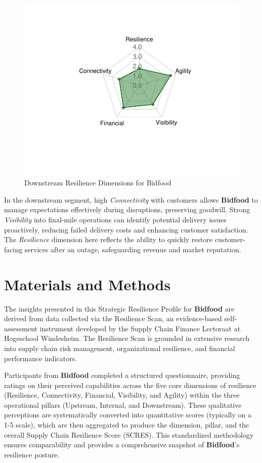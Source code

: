\documentclass[
  oneside,
  open=any,
  fontsize=11pt]{scrbook}
\begin{document}
\begin{figure}[H]

{\centering \includegraphics[width=0.8\linewidth,height=\textheight,keepaspectratio]{example_3_files/figure-pdf/downstream-radar-chart-1.pdf}

}

\caption{Downstream Resilience Dimensions for Bidfood}

\end{figure}%

In the downstream segment, high \emph{Connectivity} with customers
allows \textbf{Bidfood} to manage expectations effectively during
disruptions, preserving goodwill. Strong \emph{Visibility} into
final-mile operations can identify potential delivery issues
proactively, reducing failed delivery costs and enhancing customer
satisfaction. The \emph{Resilience} dimension here reflects the ability
to quickly restore customer-facing services after an outage,
safeguarding revenue and market reputation.

\chapter{Materials and Methods}\label{materials-and-methods}

The insights presented in this Strategic Resilience Profile for
\textbf{Bidfood} are derived from data collected via the Resilience
Scan, an evidence-based self-assessment instrument developed by the
Supply Chain Finance Lectoraat at Hogeschool Windesheim. The Resilience
Scan is grounded in extensive research into supply chain risk
management, organizational resilience, and financial performance
indicators.

Participants from \textbf{Bidfood} completed a structured questionnaire,
providing ratings on their perceived capabilities across the five core
dimensions of resilience (Resilience, Connectivity, Financial,
Visibility, and Agility) within the three operational pillars (Upstream,
Internal, and Downstream). These qualitative perceptions are
systematically converted into quantitative scores (typically on a 1-5
scale), which are then aggregated to produce the dimension, pillar, and
the overall Supply Chain Resilience Score (SCRES). This standardized
methodology ensures comparability and provides a comprehensive snapshot
of \textbf{Bidfood}'s resilience posture.
\end{document}

